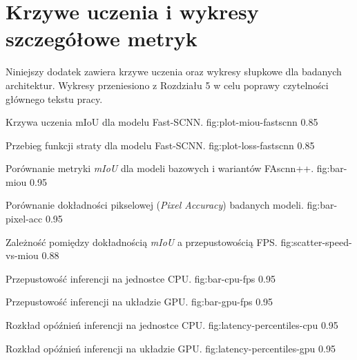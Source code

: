 \documentclass[final,a4paper,openany,12pt]{mwbk}
\begin{document}







\printbibliography

\appendix
\chapter{Krzywe uczenia i wykresy szczegółowe metryk}
Niniejszy dodatek zawiera krzywe uczenia oraz wykresy słupkowe dla badanych architektur. Wykresy przeniesiono z Rozdziału 5 w celu poprawy czytelności głównego tekstu pracy.

{Krzywa uczenia mIoU dla modelu Fast-SCNN.}
{fig:plot-miou-fastscnn}
{0.85\linewidth}

{Przebieg funkcji straty dla modelu Fast-SCNN.}
{fig:plot-loss-fastscnn}
{0.85\linewidth}

{Porównanie metryki \textit{mIoU} dla modeli bazowych i wariantów FAscnn++.}
{fig:bar-miou}
{0.95\linewidth}

{Porównanie dokładności pikselowej (\textit{Pixel Accuracy}) badanych modeli.}
{fig:bar-pixel-acc}
{0.95\linewidth}

{Zależność pomiędzy dokładnością \textit{mIoU} a przepustowością FPS.}
{fig:scatter-speed-vs-miou}
{0.88\linewidth}

{Przepustowość inferencji na jednostce CPU.}
{fig:bar-cpu-fps}
{0.95\linewidth}

{Przepustowość inferencji na układzie GPU.}
{fig:bar-gpu-fps}
{0.95\linewidth}

{Rozkład opóźnień inferencji na jednostce CPU.}
{fig:latency-percentiles-cpu}
{0.95\linewidth}

{Rozkład opóźnień inferencji na układzie GPU.}
{fig:latency-percentiles-gpu}
{0.95\linewidth}
\end{document}
